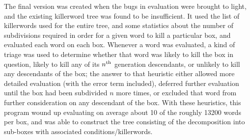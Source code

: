 The final version was created when the bugs in evaluation were
brought to light, and the existing killerword tree was found to be insufficient.
It used the list of killerwords used for the entire tree, and some
statistics about the number of subdivisions required in order for a
given word to kill a particular box, and evaluated each word on each box.  Whenever
a word was evaluated, a kind of triage was used to determine
whether that word was likely to kill the box in question, likely to kill
any of its $n^{\rm th}$ generation descendants, or unlikely to kill any
descendants of the box; the answer to that heuristic either allowed more
detailed evaluation (with the error term included), deferred further
evaluation until the box had been subdivided $n$ more times, or
excluded that word from further consideration on any descendant of
the box.  With these heuristics, this program wound up evaluating on
average about 10 of the roughly 13200 words per box, and was able to
construct the tree consisting of the decomposition into sub-boxes with associated conditions/killerwords.

